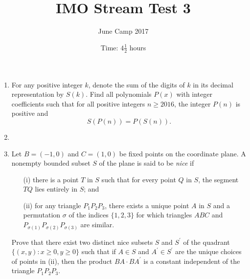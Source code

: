 \documentclass{article}
\title{IMO Stream Test 3}
\author{June Camp 2017}
\date{Time: $4\frac{1}{2}$ hours}
\begin{document}
 \maketitle

\begin{enumerate}

\item %
	For any positive integer $k$, denote the sum of the digits of $k$ in its decimal representation by $S(k)$. Find all polynomials $P(x)$ with integer coefficients such that for all positive integers $n \geq 2016$, the integer $P(n)$ is positive and \[S(P(n)) = P(S(n)).\]

\item %
	

\item %
	Let $B = (-1,0)$ and $C = (1,0)$ be fixed points on the coordinate plane. A nonempty bounded subset $S$ of the plane is said to be \emph{nice} if
	\begin{itemize}
		\item[(i)] there is a point $T$ in $S$ such that for every point $Q$ in $S$, the segment $TQ$ lies entirely in $S$; and
		\item[(ii)] for any triangle $P_1P_2P_3$, there exists a unique point $A$ in $S$ and a permutation $\sigma$ of the indices $\{1,2,3\}$ for which triangles $ABC$ and $P_{\sigma(1)}P_{\sigma(2)}P_{\sigma(3)}$ are similar.
	\end{itemize}
	
	Prove that there exist two distinct nice subsets $S$ and $S^\prime$ of the quadrant $\{(x,y) : x \geq 0, y \geq 0\}$ such that if $A \in S$ and $A^\prime \in S^\prime$ are the unique choices of points in (ii), then the product $BA\cdot BA^\prime$ is a constant independent of the triangle $P_1P_2P_3$.

\end{enumerate}
\end{document}
